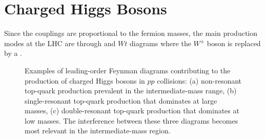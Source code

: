 \section{Charged Higgs Bosons}\label{sec:Hpm}
	Since the \Hpm couplings are proportional to the fermion masses, the main production modes at the LHC are through \ttbar and $Wt$ diagrams where the $W^{\pm}$ boson is replaced by a \Hpm.
	\begin{figure}[!ht]
		\centering
		\caption{\label{fig:hpm-diagrams} Examples of leading-order Feynman diagrams contributing to the production of charged Higgs bosons in $pp$ collisions: (a) non-resonant top-quark production prevalent in the intermediate-mass range, (b) single-resonant top-quark production that dominates at large \Hpm masses, (c) double-resonant top-quark production that dominates at low \Hpm masses. The interference between these three diagrams becomes most relevant in the intermediate-mass region.}
	\end{figure}
